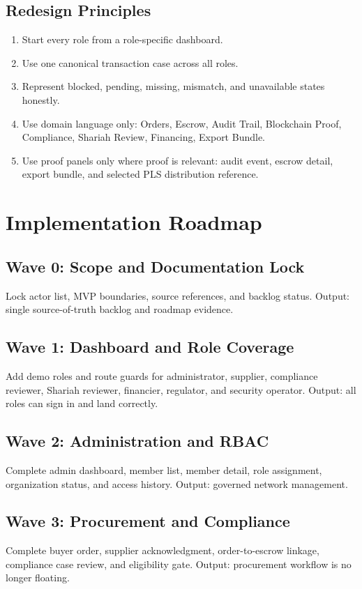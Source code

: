 \documentclass[conference]{IEEEtran}
\begin{document}
\subsection{Redesign Principles}
\begin{enumerate}
    \item Start every role from a role-specific dashboard.
    \item Use one canonical transaction case across all roles.
    \item Represent blocked, pending, missing, mismatch, and unavailable states honestly.
    \item Use domain language only: Orders, Escrow, Audit Trail, Blockchain Proof, Compliance, Shariah Review, Financing, Export Bundle.
    \item Use proof panels only where proof is relevant: audit event, escrow detail, export bundle, and selected PLS distribution reference.
\end{enumerate}

\section{Implementation Roadmap}

\subsection{Wave 0: Scope and Documentation Lock}
Lock actor list, MVP boundaries, source references, and backlog status. Output: single source-of-truth backlog and roadmap evidence.

\subsection{Wave 1: Dashboard and Role Coverage}
Add demo roles and route guards for administrator, supplier, compliance reviewer, Shariah reviewer, financier, regulator, and security operator. Output: all roles can sign in and land correctly.

\subsection{Wave 2: Administration and RBAC}
Complete admin dashboard, member list, member detail, role assignment, organization status, and access history. Output: governed network management.

\subsection{Wave 3: Procurement and Compliance}
Complete buyer order, supplier acknowledgment, order-to-escrow linkage, compliance case review, and eligibility gate. Output: procurement workflow is no longer floating.
\end{document}
